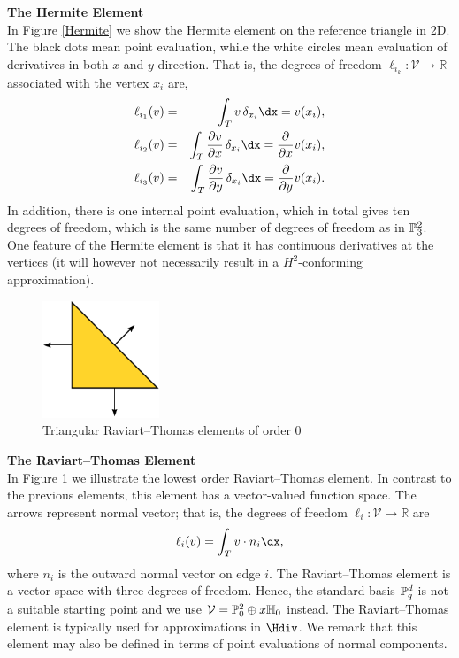 \begin{example}{\bf{ The Hermite Element}} \\
In Figure \ref{Hermite} we show the Hermite element on the reference
triangle in 2D. The black dots mean point evaluation, while the white
circles mean evaluation of derivatives in both $x$ and $y$ direction.
That is, the degrees of freedom $\ell_{i_k} : \mathcal{V} \rightarrow
\mathbb{R}$ associated with the vertex $x_i$ are,
\begin{eqnarray}
\ell_{i_1} ( v) &=& \int_{T} {v} \, \delta_{x_i} \dx = v(x_i),    \\
\ell_{i_2} ( v) &=& \int_{T} \frac{\partial{v}}{\partial x} \, \delta_{x_i} \dx = \frac{\partial}{\partial x} v(x_i),  \\
\ell_{i_3} ( v) &=& \int_{T} \frac{\partial{v}}{\partial y} \, \delta_{x_i} \dx = \frac{\partial}{\partial y} v(x_i) .
\end{eqnarray}
In addition, there is one internal point evaluation, which in total gives
ten degrees of freedom, which is the same number of degrees of freedom as
in $\P^2_3$.  One feature of the Hermite element is that it has continuous
derivatives at the vertices (it will however not necessarily result in
a $H^2$-conforming approximation).
\end{example}

\begin{figure}
  \begin{center}
    \includegraphics[height=3.5cm]{chapters/kirby-6/pdf/RT0.pdf}
    \caption{Triangular Raviart--Thomas elements of order 0}
    \label{Raviart-Thomas}
  \end{center}
\end{figure}

\begin{example}{\bf{The Raviart--Thomas Element}} \\
In Figure \ref{Raviart-Thomas} we illustrate the lowest order
Raviart--Thomas element.  In contrast to the previous elements, this
element has a vector-valued function space.  The arrows represent normal
vector; that is, the degrees of freedom $\ell_i : \mathcal{V} \rightarrow
\mathbb{R}$ are
\begin{equation}
\ell_i ( v) = \int_{T} v \cdot n_i  \dx ,
\end{equation}
where $n_i$ is the outward normal vector on edge $i$.  The Raviart--Thomas
element is a vector space with three degrees of freedom. Hence, the
standard basis $\P^d_q$ is not a suitable starting point and we use
$\mathcal{V} = \P_0^2 \oplus x \H_0$ instead.  The Raviart--Thomas
element is typically used for approximations in $\Hdiv$.  We remark
that this element may also be defined in terms of point evaluations of
normal components.
\end{example}

